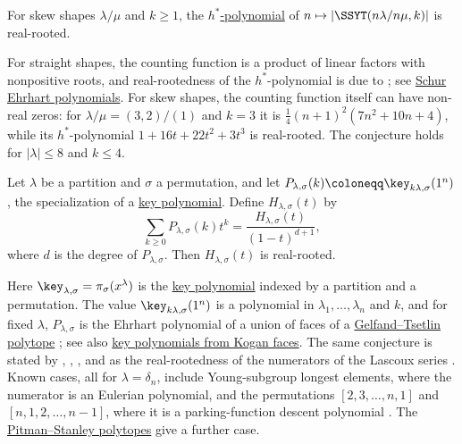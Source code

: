 \begin{conjecture}
\label{conjSkewSchurHStar}
For skew shapes $\lambda/\mu$ and $k\geq1$, the
\hyperref[hStarPolynomial]{$h^*$-polynomial} of
$n\mapsto|\SSYT(n\lambda/n\mu,k)|$ is real-rooted.
\end{conjecture}

For straight shapes, the counting function is a product of linear factors
with nonpositive roots, and real-rootedness of the $h^*$-polynomial is
due to  \cite{Brenti1989}; see
\hyperref[schurEhrhartRealRooted]{Schur Ehrhart polynomials}.  For skew
shapes, the counting function itself can have non-real zeros: for
$\lambda/\mu=(3,2)/(1)$ and $k=3$ it is
$\frac14(n+1)^2(7n^2+10n+4)$, while its $h^*$-polynomial
$1+16t+22t^2+3t^3$ is real-rooted.  The conjecture holds for
$|\lambda|\leq8$ and $k\leq4$.

\begin{conjecture}
\label{keyHStarRealRootedConjecture}\label{keyRealRootedHstar}
Let $\lambda$ be a partition and $\sigma$ a permutation, and let
$P_{\lambda,\sigma}(k)\coloneqq\key_{k\lambda,\sigma}(1^n)$, the
specialization of a \hyperref[key]{key polynomial}.  Define
$H_{\lambda,\sigma}(t)$ by
\[
  \sum_{k\geq0}P_{\lambda,\sigma}(k)t^k
  =\frac{H_{\lambda,\sigma}(t)}{(1-t)^{d+1}},
\]
where $d$ is the degree of $P_{\lambda,\sigma}$.  Then
$H_{\lambda,\sigma}(t)$ is real-rooted.
\end{conjecture}

Here $\key_{\lambda,\sigma}=\pi_\sigma(x^\lambda)$ is the
\hyperref[keyPolynomialOperatorDefinition]{key polynomial} indexed by a
partition and a permutation.  The value $\key_{k\lambda,\sigma}(1^n)$ is a
polynomial in $\lambda_1,\dotsc,\lambda_n$ and $k$, and for fixed $\lambda$,
$P_{\lambda,\sigma}$ is the Ehrhart polynomial of a union of faces of a
\hyperref[gtpolytopes]{Gelfand--Tsetlin polytope}
\cite{AlexanderssonAlhajjar2018}; see also
\hyperref[keyKogan]{key polynomials from Kogan faces}.  The same conjecture is stated
by , , ,
and  as the real-rootedness of the numerators of the
Lascoux series \cite[Conj.~6.3]{GaoLiuYangZhao2026x}.  Known cases, all for $\lambda=\delta_n$, include
Young-subgroup longest elements, where the numerator is an Eulerian
polynomial, and the permutations $[2,3,\dotsc,n,1]$ and
$[n,1,2,\dotsc,n-1]$, where it is a parking-function descent polynomial
\cite[Thm.~1.1]{GaoLiuYangZhao2026x}.  The
\hyperref[pitmanStanleyPolytope]{Pitman--Stanley polytopes} give a further
case.

